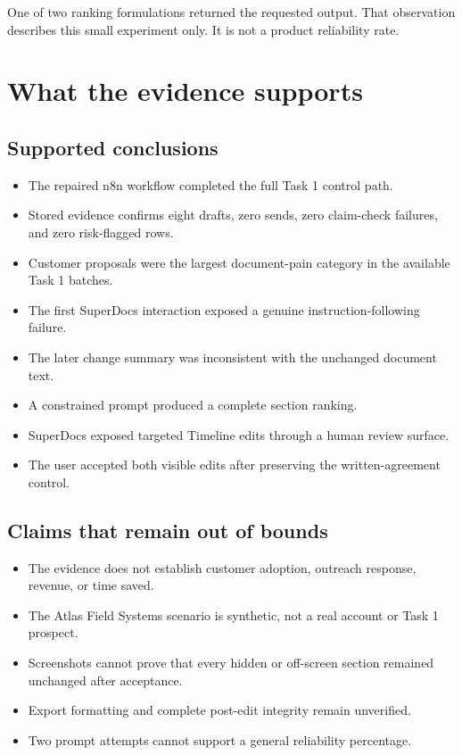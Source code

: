 \documentclass[11pt,a4paper]{article}
\begin{document}
One of two ranking formulations returned the requested output. That observation describes this small experiment only. It is not a product reliability rate.

\section{What the evidence supports}

\subsection{Supported conclusions}

\begin{itemize}
  \item The repaired n8n workflow completed the full Task 1 control path.
  \item Stored evidence confirms eight drafts, zero sends, zero claim-check failures, and zero risk-flagged rows.
  \item Customer proposals were the largest document-pain category in the available Task 1 batches.
  \item The first SuperDocs interaction exposed a genuine instruction-following failure.
  \item The later change summary was inconsistent with the unchanged document text.
  \item A constrained prompt produced a complete section ranking.
  \item SuperDocs exposed targeted Timeline edits through a human review surface.
  \item The user accepted both visible edits after preserving the written-agreement control.
\end{itemize}

\subsection{Claims that remain out of bounds}

\begin{itemize}
  \item The evidence does not establish customer adoption, outreach response, revenue, or time saved.
  \item The Atlas Field Systems scenario is synthetic, not a real account or Task 1 prospect.
  \item Screenshots cannot prove that every hidden or off-screen section remained unchanged after acceptance.
  \item Export formatting and complete post-edit integrity remain unverified.
  \item Two prompt attempts cannot support a general reliability percentage.
\end{itemize}
\end{document}
